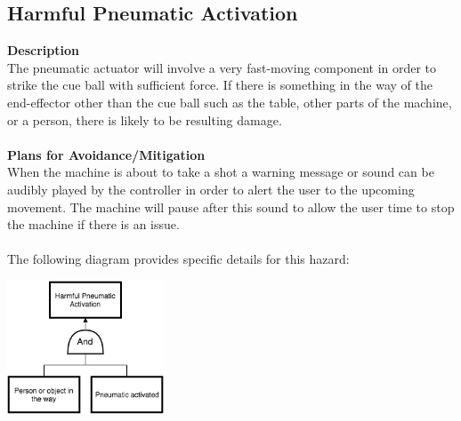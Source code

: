 \documentclass[titlepage]{article}
\begin{document}
\subsection{Harmful Pneumatic Activation}
\textbf{Description}\\
The pneumatic actuator will involve a very fast-moving component in order to strike the cue ball with sufficient force. If there is something in the way of the end-effector other than the cue ball such as the table, other parts of the machine, or a person, there is likely to be resulting damage.\\~\\
\textbf{Plans for Avoidance/Mitigation}\\
When the machine is about to take a shot a warning message or sound can be audibly played by the controller in order to alert the user to the upcoming movement. The machine will pause after this sound to allow the user time to stop the machine if there is an issue.\\~\\
The following diagram provides specific details for this hazard:\\
\begin{center}
	\includegraphics[width=0.35\textwidth]{PneumaticFTA.png}
\label{fig:yRailFig}
\end{center}

\newpage
\end{document}
